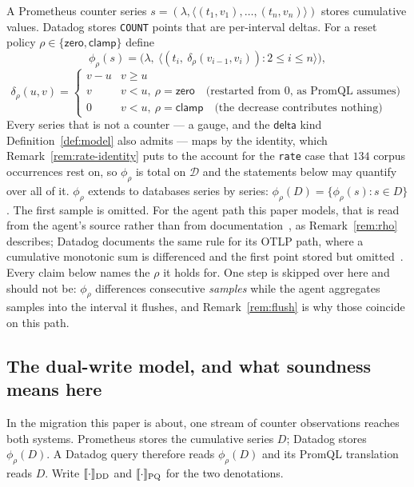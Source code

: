 \begin{definition}\label{def:phi}
A Prometheus counter series $s=(\lambda,\langle (t_1,v_1),\dots,(t_n,v_n)\rangle)$ stores
cumulative values. Datadog stores \texttt{COUNT} points that are per-interval deltas. For a
reset policy $\rho\in\{\mathsf{zero},\mathsf{clamp}\}$ define
\[
\phi_\rho(s) = \big(\lambda,\ \langle (t_i,\ \delta_\rho(v_{i-1},v_i)) : 2\le i\le n \rangle\big),
\]
\[
\delta_\rho(u,v)=\begin{cases}
v-u & v\ge u\\
v & v<u,\ \rho=\mathsf{zero}\quad\text{(restarted from $0$, as PromQL assumes)}\\
0 & v<u,\ \rho=\mathsf{clamp}\quad\text{(the decrease contributes nothing)}
\end{cases}
\]
Every series that is not a counter --- a gauge, and the $\mathsf{delta}$ kind
Definition~\ref{def:model} also admits --- maps by the identity, which
Remark~\ref{rem:rate-identity} puts to the account for the \texttt{rate} case that
$134$ corpus occurrences rest on, so $\phi_\rho$ is total
on $\mathcal{D}$ and the statements below may quantify over all of it.
$\phi_\rho$ extends to databases series by series:
$\phi_\rho(D)=\{\phi_\rho(s): s\in D\}$. The first sample is omitted. For the agent path
this paper models, that is read from the agent's source rather than from
documentation~\citep{ddagent}, as Remark~\ref{rem:rho} describes; Datadog documents the
same rule for its OTLP path, where a cumulative monotonic sum is differenced and the
first point stored but omitted~\citep{ddotlp}. Every claim below names the
$\rho$ it holds for. One step is skipped over here and should not be: $\phi_\rho$
differences consecutive \emph{samples} while the agent aggregates samples into the
interval it flushes, and Remark~\ref{rem:flush} is why those coincide on this path.
\end{definition}

\iffull\fi

\iffull\fi

\subsection{The dual-write model, and what soundness means here}

\noindent
In the migration this paper is about, one stream of counter observations reaches both
systems. Prometheus stores the cumulative series $D$; Datadog stores $\phi_\rho(D)$. A
Datadog query therefore reads $\phi_\rho(D)$ and its PromQL translation reads $D$. Write
$\llbracket \cdot \rrbracket_{\mathrm{DD}}$ and $\llbracket \cdot \rrbracket_{\mathrm{PQ}}$ for the two denotations.

